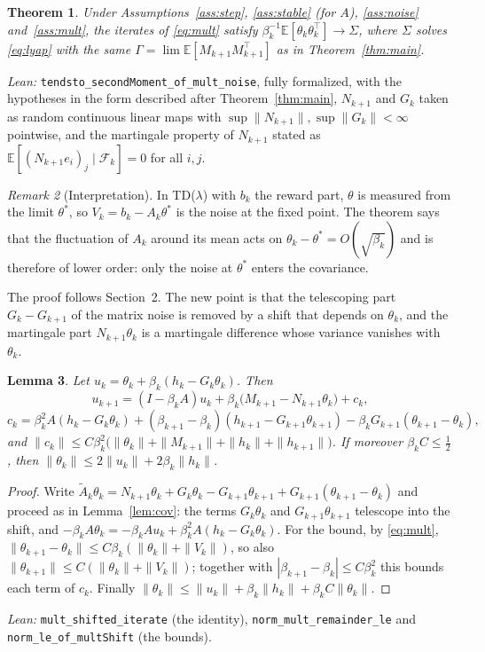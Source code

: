\documentclass[11pt]{article}
\newtheorem{theorem}{Theorem}[section]
\newtheorem{lemma}[theorem]{Lemma}
\theoremstyle{definition}
\theoremstyle{remark}
\newtheorem{remark}[theorem]{Remark}
\newcommand{\E}{\mathbb{E}}
\newcommand{\F}{\mathcal{F}}
\begin{document}
\begin{theorem}\label{thm:mult}
Under Assumptions~\ref{ass:step}, \ref{ass:stable} (for $A$), \ref{ass:noise}
and~\ref{ass:mult}, the iterates of \eqref{eq:mult} satisfy
$\beta_k^{-1}\E[\theta_k\theta_k^\top] \to \Sigma$, where $\Sigma$ solves \eqref{eq:lyap} with
the same $\Gamma = \lim\E[M_{k+1}M_{k+1}^\top]$ as in Theorem~\ref{thm:main}.
\end{theorem}

\noindent\emph{Lean:} \texttt{tendsto\_secondMoment\_of\_mult\_noise}, fully formalized, with
the hypotheses in the form described after Theorem~\ref{thm:main}, $N_{k+1}$ and $G_k$ taken as
random continuous linear maps with $\sup\|N_{k+1}\|, \sup\|G_k\| < \infty$ pointwise, and the
martingale property of $N_{k+1}$ stated as $\E[(N_{k+1}e_i)_j\mid\F_k] = 0$ for all $i, j$.

\begin{remark}[Interpretation]
In TD($\lambda$) with $b_k$ the reward part, $\theta$ is measured from the limit $\theta^*$, so
$V_k = b_k - A_k\theta^*$ is the noise at the fixed point. The theorem says that the
fluctuation of $A_k$ around its mean acts on $\theta_k - \theta^* = O(\sqrt{\beta_k})$ and is
therefore of lower order: only the noise at $\theta^*$ enters the covariance.
\end{remark}

The proof follows Section~2. The new point is that the telescoping part $G_k - G_{k+1}$ of the
matrix noise is removed by a shift that depends on $\theta_k$, and the martingale part
$N_{k+1}\theta_k$ is a martingale difference whose variance vanishes with $\theta_k$.

\begin{lemma}\label{lem:mult-shift}
Let $u_k = \theta_k + \beta_k(h_k - G_k\theta_k)$. Then
\[
  u_{k+1} = (I - \beta_kA)u_k + \beta_k\big(M_{k+1} - N_{k+1}\theta_k\big) + c_k,
\]
\[
  c_k = \beta_k^2A(h_k - G_k\theta_k) + (\beta_{k+1} - \beta_k)(h_{k+1} - G_{k+1}\theta_{k+1})
    - \beta_kG_{k+1}(\theta_{k+1} - \theta_k),
\]
and $\|c_k\| \le C\beta_k^2\big(\|\theta_k\| + \|M_{k+1}\| + \|h_k\| + \|h_{k+1}\|\big)$.
If moreover $\beta_kC \le \tfrac12$, then $\|\theta_k\| \le 2\|u_k\| + 2\beta_k\|h_k\|$.
\end{lemma}
\begin{proof}
Write $\tilde A_k\theta_k = N_{k+1}\theta_k + G_k\theta_k - G_{k+1}\theta_{k+1}
+ G_{k+1}(\theta_{k+1} - \theta_k)$ and proceed as in Lemma~\ref{lem:cov}: the terms
$G_k\theta_k$ and $G_{k+1}\theta_{k+1}$ telescope into the shift, and
$-\beta_kA\theta_k = -\beta_kAu_k + \beta_k^2A(h_k - G_k\theta_k)$. For the bound, by
\eqref{eq:mult}, $\|\theta_{k+1} - \theta_k\| \le C\beta_k(\|\theta_k\| + \|V_k\|)$, so also
$\|\theta_{k+1}\| \le C(\|\theta_k\| + \|V_k\|)$; together with $|\beta_{k+1} - \beta_k| \le C\beta_k^2$
this bounds each term of $c_k$. Finally
$\|\theta_k\| \le \|u_k\| + \beta_k\|h_k\| + \beta_kC\|\theta_k\|$.
\end{proof}
\noindent\emph{Lean:} \texttt{mult\_shifted\_iterate} (the identity), \texttt{norm\_mult\_remainder\_le}
and \texttt{norm\_le\_of\_multShift} (the bounds).
\end{document}
